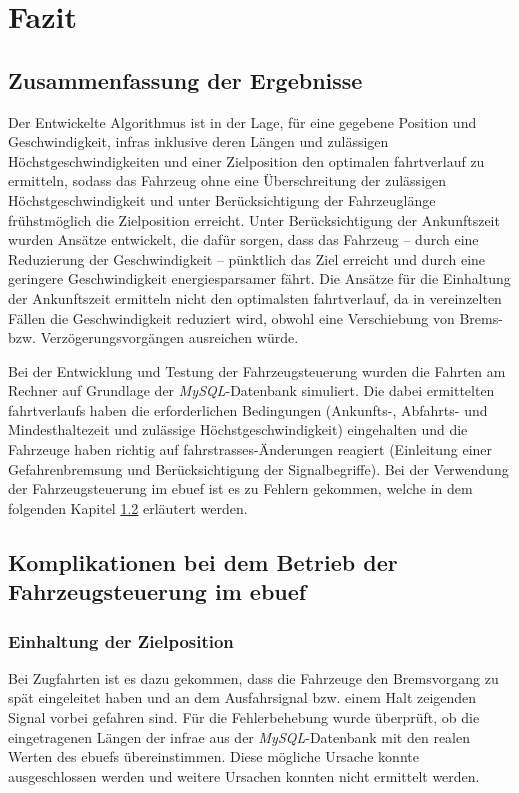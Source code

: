 \section{Fazit}
\subsection{Zusammenfassung der Ergebnisse}
Der Entwickelte Algorithmus ist in der Lage, für eine gegebene Position und Geschwindigkeit, \acp{infra} inklusive deren Längen und zulässigen Höchstgeschwindigkeiten und einer Zielposition den optimalen \Gls{fahrtverlauf} zu ermitteln, sodass das Fahrzeug ohne eine Überschreitung der zulässigen Höchstgeschwindigkeit und unter Berücksichtigung der Fahrzeuglänge frühstmöglich die Zielposition erreicht. Unter Berücksichtigung der Ankunftszeit wurden Ansätze entwickelt, die dafür sorgen, dass das Fahrzeug -- durch eine Reduzierung der Geschwindigkeit -- pünktlich das Ziel erreicht und durch eine geringere Geschwindigkeit energiesparsamer fährt. Die Ansätze für die Einhaltung der Ankunftszeit ermitteln nicht den optimalsten \Gls{fahrtverlauf}, da in vereinzelten Fällen die Geschwindigkeit reduziert wird, obwohl eine Verschiebung von Brems- bzw. Verzögerungsvorgängen ausreichen würde.

Bei der Entwicklung und Testung der Fahrzeugsteuerung wurden die Fahrten am Rechner auf Grundlage der \textit{MySQL}-Datenbank simuliert. Die dabei ermittelten \Glspl{fahrtverlauf} haben die erforderlichen Bedingungen (Ankunfts-, Abfahrts- und Mindesthaltezeit und zulässige Höchstgeschwindigkeit) eingehalten und die Fahrzeuge haben richtig auf \Glspl{fahrstrasse}-Änderungen reagiert (Einleitung einer Gefahrenbremsung und Berücksichtigung der Signalbegriffe). Bei der Verwendung der Fahrzeugsteuerung im \ac{ebuef} ist es zu Fehlern gekommen, welche in dem folgenden Kapitel \ref{fazit2} erläutert werden.
\subsection{Komplikationen bei dem Betrieb der Fahrzeugsteuerung im \ac{ebuef}} \label{fazit2}
\subsubsection{Einhaltung der Zielposition}
Bei Zugfahrten ist es dazu gekommen, dass die Fahrzeuge den Bremsvorgang zu spät eingeleitet haben und an dem Ausfahrsignal bzw. einem Halt zeigenden Signal vorbei gefahren sind. Für die Fehlerbehebung wurde überprüft, ob die eingetragenen Längen der \ac{infra}e aus der \textit{MySQL}-Datenbank mit den realen Werten des \acp{ebuef} übereinstimmen. Diese mögliche Ursache konnte ausgeschlossen werden und weitere Ursachen konnten nicht ermittelt werden.
